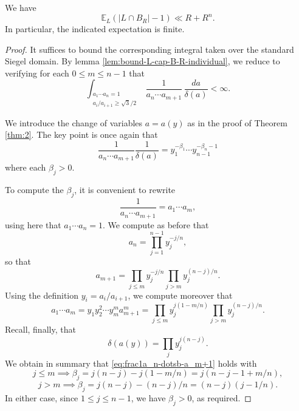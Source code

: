 \documentclass[reqno]{amsart} 
\begin{document}
\begin{lemma}\label{lem:we-have--1}
  We have
  \begin{equation*}
    \mathbb{E} _{L} (|L \cap B_R| - 1) \ll R + R^n.
  \end{equation*}
  In particular, the indicated expectation is finite.
\end{lemma}
\begin{proof}
  It suffices to bound the corresponding integral taken over the standard Siegel domain.  By lemma \ref{lem:bound-L-cap-B-R-individual}, we reduce to verifying for each $0 \leq m \leq n-1$ that
  \begin{equation*}
    \int_{\substack{
        a_1 \dotsb a_n = 1 \\
        a_i / a_{i+1} \geq \sqrt{3}/2 } } \frac{1}{a_{n} \dotsb a_{m+1}} \, \frac{d a}{\delta(a)} < \infty.
  \end{equation*}

  We introduce the change of variables $a = a(y)$ as in the proof of Theorem \ref{thm:2}.  The key point is once again that
  \begin{equation}\label{eq:frac1a_n-dotsb-a_m+1}
    \frac{1}{a_{n} \dotsb a_{m+1}}
    \frac{1}{\delta(a)} = y_1^{-\beta_1} \dotsb y_{n-1}^{-\beta_n-1}  
  \end{equation}
  where each $\beta_j > 0$.

  To compute the $\beta_j$, it is convenient to rewrite
  \begin{equation*}
    \frac{1}{a_{n} \dotsb a_{m+1}} = a_1 \dotsb a_m,
  \end{equation*}
  using here that $a_1 \dotsb a_n = 1$.  We compute as before that
  \begin{equation*}
    a_n = \prod_{j=1}^{n-1} y_j^{-j/n},
  \end{equation*}
  so that
  \begin{equation*}
    a_{m+1} = \prod_{j \leq m} y_j^{-j/n} \prod_{j > m} y_j^{(n-j)/n}.
  \end{equation*}
  Using the definition $y_i = a_i / a_{i+1}$, we compute moreover that
  \begin{equation*}
    a_1 \dotsb a_m = y_1 y_2^2 \dotsb y_m^m a_{m+1}^m = \prod_{j \leq m} y_j^{j ( 1 - m/n)} \prod_{j > m} y_j^{(n-j)/n}.
  \end{equation*}
  Recall, finally, that
  \begin{equation*}
    \delta(a(y)) = \prod_{j} y_j^{j ( n - j)}.
  \end{equation*}
  We obtain in summary that \eqref{eq:frac1a_n-dotsb-a_m+1} holds with
  \begin{equation*}
    j \leq m \implies \beta_j = j(n-j) - j(1-m/n) = j(n - j - 1 + m/n),
  \end{equation*}
  \begin{equation*}
    j > m \implies \beta_j = j(n-j) - (n-j)/n = (n-j) (j - 1/n).
  \end{equation*}
  In either case, since $1 \leq j \leq n-1$, we have $\beta_j > 0$, as required.
\end{proof}
\end{document}
